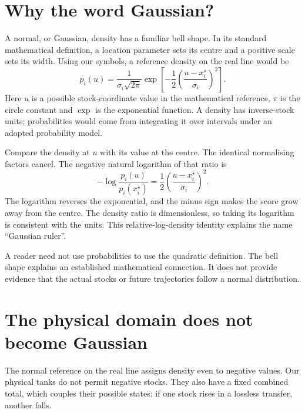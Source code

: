 
\section{Why the word Gaussian?}
A normal, or Gaussian, density has a familiar bell shape. In its standard mathematical definition, a location parameter sets its centre and a positive scale sets its width.\cite{normal} Using our symbols, a reference density on the real line would be
\begin{equation}\label{eq:normal}
 p_i(u)=\frac{1}{\sigma_i\sqrt{2\pi}}
 \exp\!\left[-\frac12\left(\frac{u-x_i^\star}{\sigma_i}\right)^2\right].
\end{equation}
Here $u$ is a possible stock-coordinate value in the mathematical reference, $\pi$ is the circle constant and $\exp$ is the exponential function. A density has inverse-stock units; probabilities would come from integrating it over intervals under an adopted probability model.

Compare the density at $u$ with its value at the centre. The identical normalising factors cancel. The negative natural logarithm of that ratio is
\begin{equation}\label{eq:log}
 -\log\frac{p_i(u)}{p_i(x_i^\star)}
 =\frac12\left(\frac{u-x_i^\star}{\sigma_i}\right)^2.
\end{equation}
The logarithm reverses the exponential, and the minus sign makes the score grow away from the centre. The density ratio is dimensionless, so taking its logarithm is consistent with the units. This relative-log-density identity explains the name ``Gaussian ruler''.

A reader need not use probabilities to use the quadratic definition. The bell shape explains an established mathematical connection. It does not provide evidence that the actual stocks or future trajectories follow a normal distribution.

\section{The physical domain does not become Gaussian}
The normal reference on the real line assigns density even to negative values. Our physical tanks do not permit negative stocks. They also have a fixed combined total, which couples their possible states: if one stock rises in a lossless transfer, another falls.

